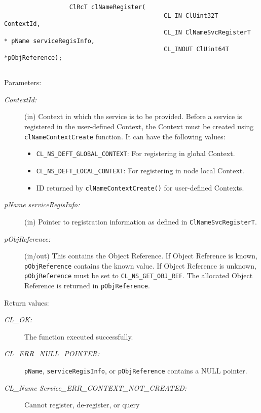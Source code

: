 \begin{flushleft}
\begin{Desc}
\footnotesize\begin{verbatim}                  ClRcT clNameRegister(
                                 			CL_IN ClUint32T  ContextId,
                                 			CL_IN ClNameSvcRegisterT  * pName serviceRegisInfo,
                                 			CL_INOUT ClUint64T  *pObjReference);


\end{verbatim}
\normalsize
\end{Desc}
\begin{Desc}
\item[Parameters:]
\begin{description}
\item[{\em Context\-Id:}](in) Context in which the service is to be provided. Before a service is registered in the user-defined Context, the Context must be created      
using {\tt{clNameContextCreate}} function. It can have the following values: \begin{itemize}
\item
 {\tt{CL\_\-NS\_\-DEFT\_\-GLOBAL\_\-CONTEXT}}: For registering in global Context. 
\item
{\tt{CL\_\-NS\_\-DEFT\_\-LOCAL\_\-CONTEXT}}: For registering in node local Context. 
 \item
 ID returned by {\tt{clNameContextCreate()}} for user-defined Contexts.
\end{itemize}
\item[{\em p\-Name serviceRegis\-Info:}](in) Pointer to registration information as defined in {\tt{ClNameSvcRegisterT}}.
\item[{\em p\-Obj\-Reference:}](in/out) This contains the Object Reference. If Object Reference is known, {\tt{pObjReference}} contains the known value. If 
Object Reference is unknown, {\tt{pObjReference}} must be set to {\tt{CL\_\-NS\_\-GET\_\-OBJ\_\-REF}}. The allocated Object Reference is returned in 
{\tt{pObjReference}}.
\end{description}
\end{Desc}
\begin{Desc}
\item[Return values:]
\begin{description}
\item[{\em CL\_\-OK:}]The function executed successfully. 
\item[{\em CL\_\-ERR\_\-NULL\_\-POINTER:}]{\tt{pName}}, {\tt{serviceRegisInfo}}, or {\tt{pObjReference}}  contains a NULL pointer.
\item[{\em CL\_\-Name Service\_\-ERR\_\-CONTEXT\_\-NOT\_\-CREATED:}]Cannot register, de-register, or query

\end{description}
\end{Desc}
\end{flushleft}
